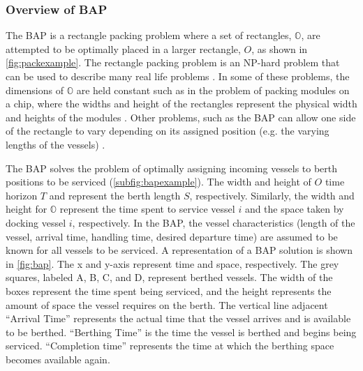 \documentclass[11pt,a4paper,final]{article}
\begin{document}
\subsubsection{Overview of BAP}
The BAP is a rectangle packing problem where a set of rectangles, \(\mathbb{O}\), are attempted to be optimally placed in
a larger rectangle, \(O\), as shown in \autoref{fig:packexample}. The rectangle packing problem is an NP-hard problem that
can be used to describe many real life problems \cite{Bruin2013,Murata1995}. In some of these problems, the dimensions
of \(\mathbb{O}\) are held constant such as in the problem of packing modules on a chip, where the widths and height of
the rectangles represent the physical width and heights of the modules \cite{Murata1995}. Other problems, such as the
BAP can allow one side of the rectangle to vary depending on its assigned position (e.g. the varying lengths of the
vessels) \cite{Buhrkal2010}.

The BAP solves the problem of optimally assigning incoming vessels to berth positions to be serviced
(\autoref{subfig:bapexample}). The width and height of \(O\) time horizon \(T\) and represent the berth length \(S\),
respectively. Similarly, the width and height for \(\mathbb{O}\) represent the time spent to service vessel \(i\) and the
space taken by docking vessel \(i\), respectively. In the BAP, the vessel characteristics (length of the vessel, arrival
time, handling time, desired departure time) are assumed to be known for all vessels to be serviced. A representation of
a BAP solution is shown in \autoref{fig:bap}. The x and y-axis represent time and space, respectively. The grey squares,
labeled A, B, C, and D, represent berthed vessels. The width of the boxes represent the time spent being serviced, and
the height represents the amount of space the vessel requires on the berth. The vertical line adjacent
 ``Arrival Time'' represents the actual
time that the vessel arrives and is available to be berthed. ``Berthing Time'' is the time the vessel is berthed and
begins being serviced. ``Completion time'' represents the time at which the berthing space becomes available again.
\end{document}
